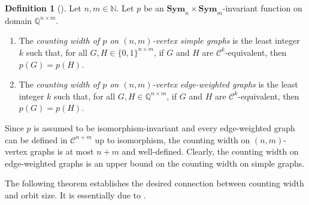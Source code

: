 \documentclass[10pt,a4paper]{article}
\theoremstyle{definition}
\newtheorem{definition}{Definition}[section]
\theoremstyle{plain}
\theoremstyle{remark}
\newcommand{\Sym}{\mathbf{Sym}}
\begin{document}
	\begin{definition}[\cite{dawar_definability_2017}]
		\label{def:counting-width}
		Let $n,m\in \mathbb{N}$.
		Let $p$ be an $\Sym_n \times \Sym_m$-invariant function on domain $\mathbb{Q}^{n \times m}$. 
		\begin{enumerate}
			\item The \emph{counting width of $p$ on $(n,m)$-vertex simple graphs} is the least integer $k$ such that, for all $G, H \in \{0,1\}^{n \times m}$, if $G$ and $H$ are $\mathcal{C}^k$-equivalent, then $p(G) = p(H)$.
			\item The \emph{counting width of $p$ on $(n,m)$-vertex edge-weighted graphs} is the least integer $k$ such that, for all $G, H \in \mathbb{Q}^{n \times m}$, if $G$ and $H$ are $\mathcal{C}^k$-equivalent, then $p(G) = p(H)$.
		\end{enumerate}
	\end{definition} 
	
	Since $p$ is assumed to be isomorphism-invariant and every edge-weighted graph can be defined in $\mathcal{C}^{n+m}$ up to isomorphism, the counting width on $(n,m)$-vertex graphs is at most $n+m$ and well-defined.
	Clearly, the counting width on edge-weighted graphs is an upper bound on the counting width on simple graphs.
	
	The following theorem establishes the desired connection between counting width and orbit size.	
	It is essentially due to \textcite{anderson_symmetric_2017}.
	
\end{document}

